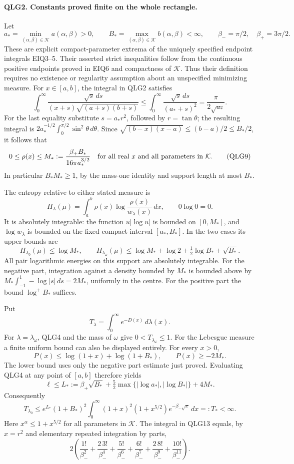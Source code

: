 \paragraph{QLG2. Constants proved finite on the whole rectangle.}
Let
\[
 a_* =\min_{(\alpha,\beta)\in\mathcal K} a(\alpha,\beta)>0,
 \qquad B_* =\max_{(\alpha,\beta)\in\mathcal K} b(\alpha,\beta)<\infty,
 \qquad \beta_-=\pi/2,\quad\beta_+=3\pi/2.
 \tag{QLG8}
\]
These are explicit compact-parameter extrema of the uniquely specified
endpoint integrals EIQ3--5. Their asserted strict inequalities follow
from the continuous positive endpoints proved in EIQ6 and compactness
of \(\mathcal K\). Thus their definition requires no existence or
regularity assumption about an unspecified minimizing measure.
For \(x\in[a,b]\), the integral in QLG2 satisfies
\[
 \int_0^\infty\frac{\sqrt{s}\,ds}{(x+s)\sqrt{(a+s)(b+s)}}
 \leq\int_0^\infty\frac{\sqrt{s}\,ds}{(a_*+s)^2}
 =\frac{\pi}{2\sqrt{a_*}}.
\]
For the last equality substitute \(s=a_*r^2\), followed by
\(r=\tan\theta\); the resulting integral is
\(2a_*^{-1/2}\int_0^{\pi/2}\sin^2\theta\,d\theta\).
Since \(\sqrt{(b-x)(x-a)}\leq(b-a)/2\leq B_*/2\), it follows that
\[
 0\leq\rho(x)\leq M_*:=\frac{\beta_+B_*}{16\pi a_*^{3/2}}
       \quad\hbox{for all real }x\hbox{ and all parameters in }\mathcal K.
 \tag{QLG9}
\]
In particular \(B_*M_*\geq1\), by the mass-one identity and support
length at most \(B_*\).

The entropy relative to either stated measure is
\[
 H_\lambda(\mu)=\int_a^b
                 \rho(x)\log\frac{\rho(x)}{w_\lambda(x)}\,dx,
       \qquad 0\log0=0.
 \tag{QLG10}
\]
It is absolutely integrable: the function \(u|\log u|\) is bounded
on \([0,M_*]\), and \(\log w_\lambda\) is bounded on the fixed
compact interval \([a_*,B_*]\). In the two cases its upper bounds are
\[
 H_{\lambda_0}(\mu)\leq\log M_* ,\qquad
 H_{\lambda_\omega}(\mu)\leq
 \log M_*+\log2+\tfrac12\log B_*+\sqrt{B_*}.
 \tag{QLG11}
\]
All pair logarithmic energies on this support are absolutely
integrable. For the negative part, integration against a density
bounded by \(M_*\) is bounded above by
\(M_*\int_{-1}^1-\log|s|\,ds=2M_*\), uniformly in the centre.
For the positive part the bound \(\log^+ B_*\) suffices.

Put
\[
 T_\lambda=\int_0^\infty e^{-D(x)}\,d\lambda(x).
 \tag{QLG12}
\]
For \(\lambda=\lambda_\omega\), QLG4 and the mass of \(\omega\)
give \(0<T_{\lambda_\omega}\leq1\). For the Lebesgue measure a finite
uniform bound can also be displayed entirely. For every \(x>0\),
\[
 P(x)\leq\log(1+x)+\log(1+B_*),\qquad P(x)\geq-2M_*.
\]
The lower bound uses only the negative part estimate just proved.
Evaluating QLG4 at any point of \([a,b]\) therefore yields
\[
 \ell\leq L_*:=\beta_+\sqrt{B_*}
    +\tfrac52\max\{|\log a_*|,|\log B_*|\}+4M_*.
\]
Consequently
\[
 T_{\lambda_0}\leq e^{L_*}(1+B_*)^2
    \int_0^\infty (1+x)^2(1+x^{5/2})e^{-\beta_-\sqrt{x}}\,dx
    =:T_*<\infty.
 \tag{QLG13}
\]
Here \(x^\alpha\leq1+x^{5/2}\) for all parameters in \(\mathcal K\).
The integral in QLG13 equals, by \(x=r^2\) and elementary repeated
integration by parts,
\[
 2\left(\frac{1!}{\beta_-^2}
       +\frac{2\,3!}{\beta_-^4}
       +\frac{5!}{\beta_-^6}
       +\frac{6!}{\beta_-^7}
       +\frac{2\,8!}{\beta_-^9}
       +\frac{10!}{\beta_-^{11}}\right).
 \tag{QLG14}
\]

